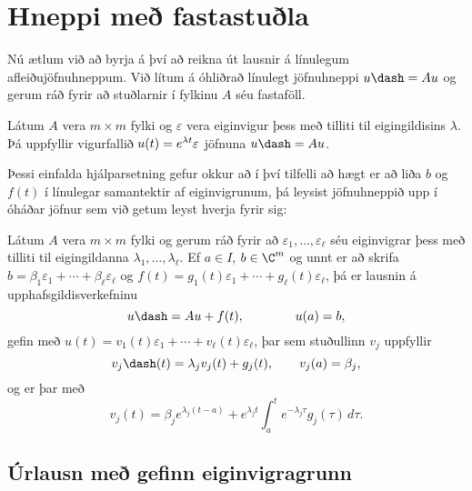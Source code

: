 \section{Hneppi með fastastuðla}

\noindent
Nú ætlum við að byrja á því að reikna út lausnir á línulegum
afleiðujöfnuhneppum.
Við lítum á óhliðrað
línulegt jöfnuhneppi $u\dash=Au$ og gerum ráð fyrir að stuðlarnir
í fylkinu $A$  séu fastaföll.

\begin{hs}
Látum $A$ vera $m\times m$ fylki og $\varepsilon$ vera
eiginvigur þess með
tilliti til eigingildisins
$\lambda$. Þá uppfyllir vigurfallið
$u(t)=e\sp{\lambda t}\varepsilon$ jöfnuna $u\dash=Au$.

{}
\end{hs}

Þessi einfalda hjálparsetning gefur okkur að í því tilfelli að hægt er
að liða $b$ og $f(t)$ í línulegar samantektir af eiginvigrunum, þá
leysist jöfnuhneppið  upp í óháðar jöfnur sem við getum leyst hverja
fyrir sig:

\begin{se}\label{set5.2.2}
Látum $A$ vera $m\times m$ fylki og gerum ráð fyrir að 
$\varepsilon_1,\dots,\varepsilon_\ell$   séu eiginvigrar
þess með tilliti til eigingildanna $\lambda_1,\dots,\lambda_\ell$.  
Ef $a \in I$, $b\in \C^m$ og unnt er að skrifa
$b=\beta_1\varepsilon_1+\cdots+\beta_\ell\varepsilon_\ell$ og 
$f(t)=g_1(t)\varepsilon_1+\cdots+g_\ell(t)\varepsilon_\ell$, þá er
lausnin á upphafsgildisverkefninu 
$$u\dash=Au+f(t), \qquad \qquad u(a)=b,
$$ 
gefin með  $u(t)=v_1(t)\varepsilon_1+\cdots+v_\ell(t)\varepsilon_\ell$, þar sem
stuðullinn $v_j$  uppfyllir
 \begin{equation*}v_j\dash(t)=\lambda_jv_j(t)+g_j(t), \qquad v_j(a)=\beta_j,\label{5.2.1}
 \end{equation*}
og er þar með 
 \begin{equation*}v_j(t)=\beta_je^{\lambda_j(t-a)}+e^{\lambda_jt}\int_a^t e^{-\lambda_j
\tau}g_j(\tau) \, d\tau.\label{5.2.2}
 \end{equation*}
\end{se}


\subsection*{Úrlausn með gefinn eiginvigragrunn}

